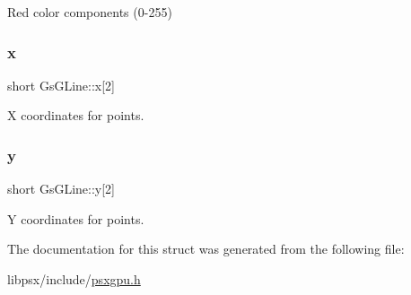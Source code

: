 Red color components (0-\/255) 

\mbox{\label{structGsGLine_ad2b2ca6e5b8118612fde4c7053c0d840}} 
\subsubsection{\texorpdfstring{x}{x}}
{\footnotesize\ttfamily short Gs\+G\+Line\+::x\mbox{[}2\mbox{]}}



X coordinates for points. 

\mbox{\label{structGsGLine_a8717aff2a54e9e287094af8717eb1dff}} 
\subsubsection{\texorpdfstring{y}{y}}
{\footnotesize\ttfamily short Gs\+G\+Line\+::y\mbox{[}2\mbox{]}}



Y coordinates for points. 



The documentation for this struct was generated from the following file\+:\begin{DoxyCompactItemize}
\item 
libpsx/include/\hyperlink{psxgpu_8h}{psxgpu.\+h}\end{DoxyCompactItemize}
